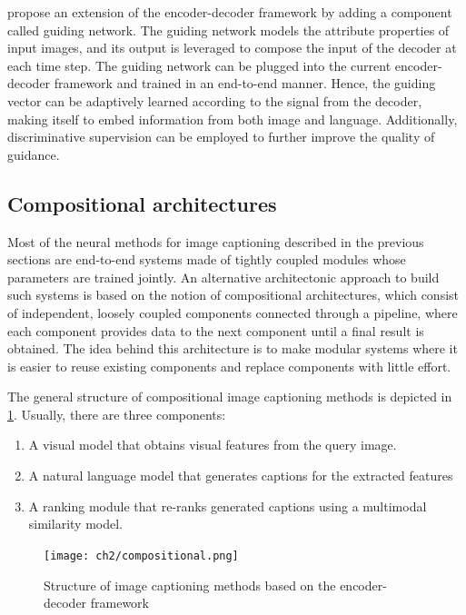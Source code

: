 \citet{Jiang2018} propose an extension of the encoder-decoder framework by adding a component called guiding network. The guiding network models the attribute properties of input images, and its output is leveraged to compose the input of the decoder at each time step. The guiding network can be plugged into the current encoder-decoder framework and trained in an end-to-end manner. Hence, the guiding vector can be adaptively learned according to the signal from the decoder, making itself to embed information from both image and language. Additionally, discriminative supervision can be employed to further improve the quality of guidance.

\subsection{Compositional architectures}\label{subsec:compositional_architectures}

Most of the neural methods for image captioning described in the previous sections are end-to-end systems made of tightly coupled modules whose parameters are trained jointly. An alternative architectonic approach to build such systems is based on the notion of compositional architectures, which consist of independent, loosely coupled components connected through a pipeline, where each component provides data to the next component until a final result is obtained. The idea behind this architecture is to make modular systems where it is easier to reuse existing components and replace components with little effort.

The general structure of compositional image captioning methods is depicted in \cref{fig:compositional}. Usually, there are three components: 
\begin{enumerate}
\item A visual model that obtains visual features from the query image.
\item A natural language model that generates captions for the extracted features
\item A ranking module that re-ranks generated captions using a multimodal similarity model.
\end{enumerate}

\begin{figure}[hpt]
    \centering
    \texttt{[image: ch2/compositional.png]}
    \caption{Structure of image captioning methods based on the encoder-decoder framework}
    \label{fig:compositional}
\end{figure}

